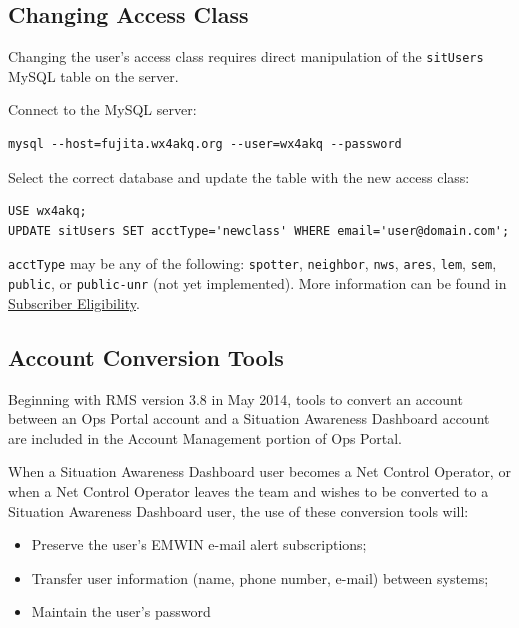 \documentclass[pdflatex,letterpaper,twoside,12pt]{book}
\begin{document}
\subsection{Changing Access Class}

Changing the user's access class requires direct manipulation of the \verb|sitUsers| MySQL table on the server.

Connect to the MySQL server:

\begin{verbatim}
mysql --host=fujita.wx4akq.org --user=wx4akq --password
\end{verbatim}

Select the correct database and update the table with the new access class:

\begin{verbatim}
USE wx4akq;
UPDATE sitUsers SET acctType='newclass' WHERE email='user@domain.com';
\end{verbatim}

\verb|acctType| may be any of the following:  \verb|spotter|, \verb|neighbor|, \verb|nws|, \verb|ares|, \verb|lem|, \verb|sem|, \verb|public|, or \verb|public-unr| (not yet implemented).  More information can be found in \hyperref[sec:eligibility]{Subscriber Eligibility}.

\subsection{Account Conversion Tools}\label{sit-account-conversion}

Beginning with RMS version 3.8 in May 2014, tools to convert an account between an Ops Portal account and a Situation Awareness Dashboard account are included in the Account Management portion of Ops Portal.

When a Situation Awareness Dashboard user becomes a Net Control Operator, or when a Net Control Operator leaves the team and wishes to be converted to a Situation Awareness Dashboard user, the use of these conversion tools will:

\begin{itemize}
\item Preserve the user's EMWIN e-mail alert subscriptions;
\item Transfer user information (name, phone number, e-mail) between systems;
\item Maintain the user's password
\end{itemize}
\end{document}

